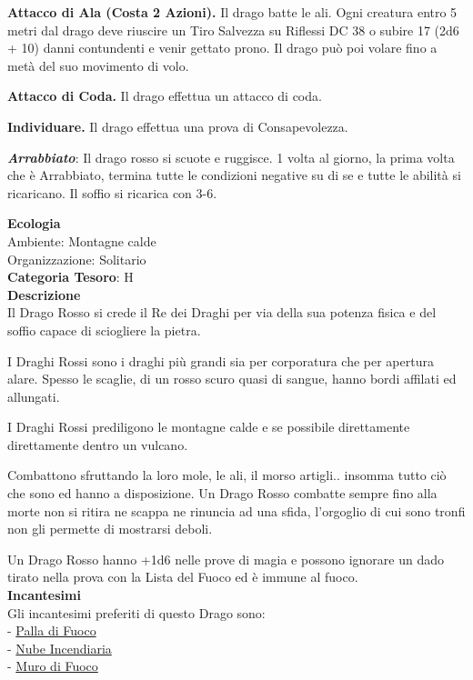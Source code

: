 \begin{multicols}{2}
{\textbf{Attacco di Ala (Costa 2 Azioni).} Il drago batte le ali. Ogni creatura entro 5 metri dal drago deve riuscire un Tiro Salvezza su Riflessi DC 38 o subire 17 (2d6 + 10) danni contundenti e venir gettato prono. Il drago può poi volare fino a metà del suo movimento di volo.

\textbf{Attacco di Coda.} Il drago effettua un attacco di coda.

\textbf{Individuare.} Il drago effettua una prova di Consapevolezza.

\emph{\textbf{Arrabbiato}}: Il drago rosso si scuote e ruggisce. 1 volta al giorno, la prima volta che è Arrabbiato, termina tutte le condizioni negative su di se e tutte le abilità si ricaricano. Il soffio si ricarica con 3-6.

\textbf{Ecologia}\\
Ambiente: Montagne calde\\
Organizzazione: Solitario\\
\textbf{Categoria Tesoro}: H\\
\textbf{Descrizione}\\
Il Drago Rosso si crede il Re dei Draghi per via della sua potenza fisica e del soffio capace di sciogliere la pietra.

I Draghi Rossi sono i draghi più grandi sia per corporatura che per apertura alare.
Spesso le scaglie, di un rosso scuro quasi di sangue, hanno bordi affilati ed allungati.

I Draghi Rossi prediligono le montagne calde e se possibile direttamente direttamente dentro un vulcano.

Combattono sfruttando la loro mole, le ali, il morso artigli.. insomma tutto ciò che sono ed hanno a disposizione. Un Drago Rosso combatte sempre fino alla morte non si ritira ne scappa ne rinuncia ad una sfida, l'orgoglio di cui sono tronfi non gli permette di mostrarsi deboli.

Un Drago Rosso hanno +1d6 nelle prove di magia e possono ignorare un dado tirato nella prova con la Lista del Fuoco ed è immune al fuoco.\\
\textbf{Incantesimi}\\
Gli incantesimi preferiti di questo Drago sono:\\
- \hyperlink{Palla di Fuoco}{Palla di Fuoco}\\
- \hyperlink{Nube Incendiaria}{Nube Incendiaria}\\
- \hyperlink{Muro di Fuoco}{Muro di Fuoco}


}
\end{multicols}
